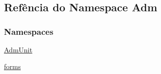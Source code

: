 \hypertarget{namespaceAdm}{}\subsection{Refência do Namespace Adm}
\label{namespaceAdm}
\subsubsection*{Namespaces}
\begin{DoxyCompactItemize}
\item 
 \hyperlink{namespaceAdm_1_1AdmUnit}{Adm\+Unit}
\item 
 \hyperlink{namespaceAdm_1_1forms}{forms}
\end{DoxyCompactItemize}
